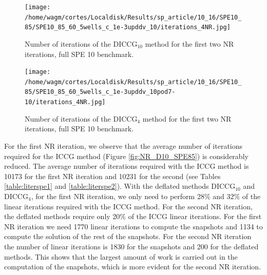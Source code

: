 \documentclass[12pt]{article}
\begin{document}
\begin{figure}[!ht]
\centering
\begin{minipage}{.4\textwidth}
\hspace{-1cm}
\texttt{[image: /home/wagm/cortes/Localdisk/Results/sp\_article/10\_16/SPE10\_85/SPE10\_85\_60\_5wells\_c\_1e-3upddv\_10/iterations\_4NR.jpg]}
\vspace{-1.3cm}
\caption{Number of iterations of the DICCG$_{10}$ method for the first two NR iterations, full SPE 10 benchmark.}
\label{fig:NR_D10_SPE85}
\end{minipage}%
\hspace{15mm}
\begin{minipage}{.4\textwidth}
\hspace{-1cm}
\texttt{[image: /home/wagm/cortes/Localdisk/Results/sp\_article/10\_16/SPE10\_85/SPE10\_85\_60\_5wells\_c\_1e-3upddv\_10pod7-10/iterations\_4NR.jpg]}
\vspace{-1.3cm}
\caption{Number of iterations of the DICCG$_{4}$ method for the first two NR iterations, full SPE 10 benchmark.}
\label{fig:NR_D4_SPE85}
\end{minipage}
\end{figure}

\begin{figure}[!h]
\centering

\end{figure}

For the first NR iteration, we observe that the average number of iterations required for the ICCG method (Figure \ref{fig:NR_D10_SPE85}) is considerably reduced. The average number of iterations required with the ICCG method is 10173 for the first NR iteration and 10231 for the second (see Tables \ref{table:literspe1} and \ref{table:literspe2}). With the deflated methods DICCG$_{10}$ and DICCG$_4$, for the first NR iteration, we only need to perform 28\% and 32\% of the linear iterations required with the ICCG method. For the second NR iteration, the deflated methods require only 20\% of the ICCG linear iterations. For the first NR iteration we need 1770 linear iterations to compute the snapshots and 1134 to compute the solution of the rest of the snapshots. For the second NR iteration the number of linear iterations is 1830 for the snapshots and 200 for the deflated methods. This shows that the largest amount of work is carried out in the computation of the snapshots, which is more evident for the second 
NR iteration.
\end{document}
